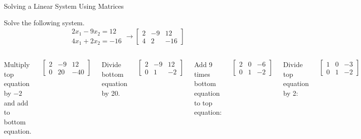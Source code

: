 \documentclass[xcolor=dvipsnames,aspectratio=169,t]{beamer}
\begin{document}
\begin{frame}{Solving a Linear System Using Matrices}

  {\small  Solve the following system.}
  {\small
   \[
   \begin{array}{l}
     2x_1 -9x_2 =12 \\
      4x_1 +2x_2=-16
  \end{array} \rightarrow
      \begin{bmatrix}
     2 & -9 & 12\\
     4 & 2 & -16
   \end{bmatrix} \]
   }

  
  \pause
  \begin{columns}[T]

     \column{0.5\tw}
            {\small
              \bb
     \ii Multiply top equation by $-2$ and add to bottom equation.

\[  \begin{bmatrix}
     2 & -9 & 12\\
     0 & 20 & -40
   \end{bmatrix} \]

  \ii Divide bottom equation by 20.

\[  \begin{bmatrix}
     2 & -9 & 12\\
     0 & 1 & -2
   \end{bmatrix} \]
\ee            }
   
     \column{0.5\tw}

     {\small
   \bb
     \addtocounter{enumi}{2}
   \ii Add 9 times bottom equation to top equation:

   \[  \begin{bmatrix}
     2 & 0 & -6 \\
     0 & 1 & -2
   \end{bmatrix} \]
 
   \ii Divide top equation by 2:

     \[  \begin{bmatrix}
     1 & 0 & -3 \\
     0 & 1 & -2
   \end{bmatrix} \]

     
\ee }

\end{columns}

\end{frame}
\end{document}
